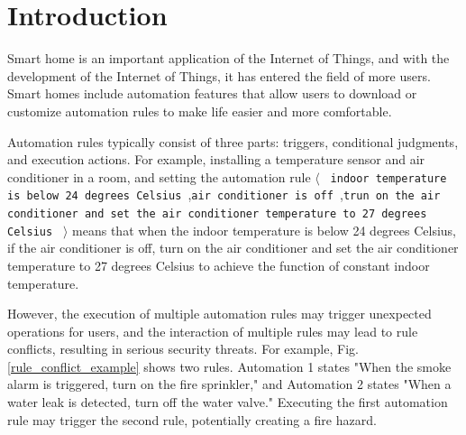 \section{Introduction}

Smart home is an important application of the Internet of Things, and with the development of the Internet of Things, it has entered the field of more users. Smart homes include automation features that allow users to download or customize automation rules to make life easier and more comfortable.\cite{example}

Automation rules typically consist of three parts: triggers, conditional judgments, and execution actions. For example, installing a temperature sensor and air conditioner in a room, and setting the automation rule $\langle$ \texttt{ indoor temperature is below 24 degrees Celsius },\texttt{air conditioner is off },\texttt{trun on the air conditioner and set the air conditioner temperature to 27 degrees Celsius } $\rangle$ means that when the indoor temperature is below 24 degrees Celsius, if the air conditioner is off, turn on the air conditioner and set the air conditioner temperature to 27 degrees Celsius to achieve the function of constant indoor temperature.

However, the execution of multiple automation rules may trigger unexpected operations for users, and the interaction of multiple rules may lead to rule conflicts, resulting in serious security threats. For example, Fig.\ref{rule_conflict_example} shows two rules. Automation 1 states "When the smoke alarm is triggered, turn on the fire sprinkler," and Automation 2 states "When a water leak is detected, turn off the water valve." Executing the first automation rule may trigger the second rule, potentially creating a fire hazard.

